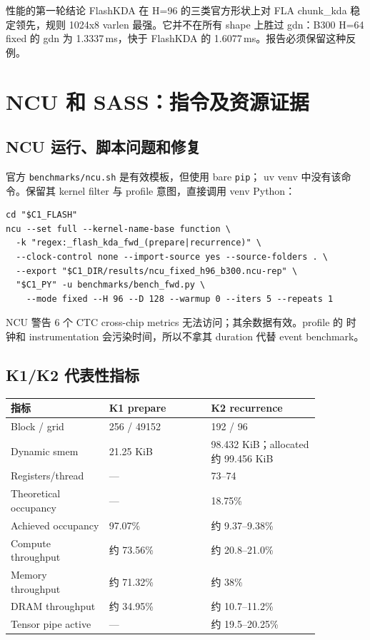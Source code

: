 \documentclass[11pt,a4paper,fontset=none]{ctexart}
\newcommand{\code}[1]{\texttt{#1}}
\begin{document}
\begin{decision}{性能的第一轮结论}
FlashKDA 在 H=96 的三类官方形状上对 FLA chunk\_kda 稳定领先，规则
1024x8 varlen 最强。它并不在所有 shape 上胜过 gdn：B300 H=64 fixed 的
gdn 为 1.3337\,ms，快于 FlashKDA 的 1.6077\,ms。报告必须保留这种反例。
\end{decision}

\section{NCU 和 SASS：指令及资源证据}

\subsection{NCU 运行、脚本问题和修复}

官方 \code{benchmarks/ncu.sh} 是有效模板，但使用 bare \code{pip}；
uv venv 中没有该命令。保留其 kernel filter 与 profile 意图，直接调用 venv
Python：

\begin{lstlisting}
cd "$C1_FLASH"
ncu --set full --kernel-name-base function \
  -k "regex:_flash_kda_fwd_(prepare|recurrence)" \
  --clock-control none --import-source yes --source-folders . \
  --export "$C1_DIR/results/ncu_fixed_h96_b300.ncu-rep" \
  "$C1_PY" -u benchmarks/bench_fwd.py \
    --mode fixed --H 96 --D 128 --warmup 0 --iters 5 --repeats 1
\end{lstlisting}

NCU 警告 6 个 CTC cross-chip metrics 无法访问；其余数据有效。profile 的
时钟和 instrumentation 会污染时间，所以不拿其 duration 代替 event benchmark。

\subsection{K1/K2 代表性指标}

\begin{longtable}{@{}L{0.27\linewidth}L{0.29\linewidth}L{0.30\linewidth}@{}}
\toprule
指标 & K1 prepare & K2 recurrence \\
\midrule
\endhead
\bottomrule
\endlastfoot
Block / grid & 256 / 49152 & 192 / 96 \\
Dynamic smem & 21.25 KiB & 98.432 KiB；allocated 约 99.456 KiB \\
Registers/thread & --- & 73--74 \\
Theoretical occupancy & --- & 18.75\% \\
Achieved occupancy & 97.07\% & 约 9.37--9.38\% \\
Compute throughput & 约 73.56\% & 约 20.8--21.0\% \\
Memory throughput & 约 71.32\% & 约 38\% \\
DRAM throughput & 约 34.95\% & 约 10.7--11.2\% \\
Tensor pipe active & --- & 约 19.5--20.25\% \\
\end{longtable}
\end{document}
